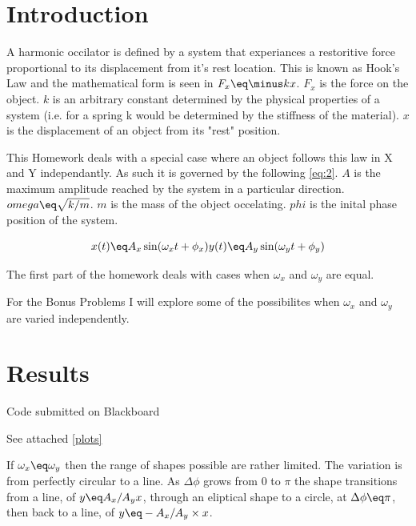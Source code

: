 \documentclass{article}
\author{\hwauthor}
\title{\hwtitle}
\date{\hwdate}
\begin{document}
\maketitle
\thispagestyle{fancy}

\section{Introduction}

A harmonic occilator is defined by a system that experiances a restoritive force proportional to its displacement from it's rest location. This is known as Hook's Law and the mathematical form is seen in \( F_{x} \eq \minus kx \). \( F_x \) is the force on the object. \( k \) is an arbitrary constant determined by the physical properties of a system (i.e. for a spring k would be determined by the stiffness of the material).  \( x \) is the displacement of an object from its "rest" position.
  

This Homework deals with a special case where an object follows this law in X and Y independantly.
As such it is governed by the following  \ref{eq:2}. \( A \) is the maximum amplitude reached by the system in a particular direction. \( omega \eq \sqrt{k/m} \). 
\( m \) is the mass of the object occelating. \( phi \) is the inital phase position of the system.

\begin{equation} \label{eq:2}
	x(t)\eq A_x\sin(\omega_xt+\phi_x)
	y(t)\eq A_y\sin(\omega_{y}t+\phi_{y})
\end{equation}

The first part of the homework deals with cases when \( \omega_x \) and \( \omega_y \) are equal. 

For the Bonus Problems I will explore some of the possibilites when \( \omega_x \) and \( \omega_y \)
are varied independently.

\section{Results}

\bigskip
{}
\medskip

Code submitted on Blackboard

\bigskip
{}
\medskip

See attached \ref{plots}

\bigskip
{}
\medskip

If \( \omega_x \eq \omega_y \) then the range of shapes possible are rather limited. The variation is from perfectly circular to a line. As \( \Delta\phi \) grows from \( 0 \) to \( \pi \) the shape transitions from a line, of \( y \eq A_x / A_yx \), through an eliptical shape to a circle, at \( \Delta\phi \eq \pi \), then back to a line, of \( y \eq -A_x / A_y \times x \).
\end{document}
